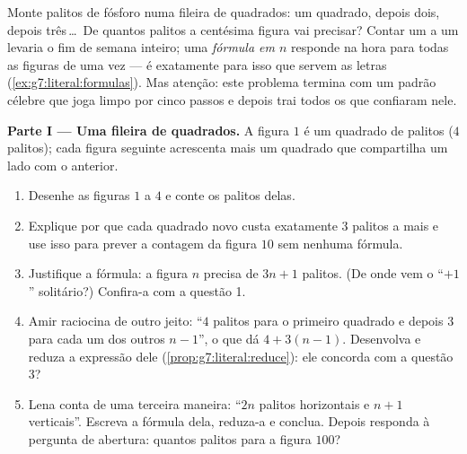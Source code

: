 \begin{problem}
\label{pb:g7:literal:1}
Monte palitos de fósforo numa fileira de quadrados: um quadrado, depois
dois, depois três\,\dots\ De quantos palitos a centésima figura vai
precisar? Contar um a um levaria o fim de semana inteiro; uma
\emph{fórmula em $n$} responde na hora para todas as figuras de uma vez
--- é exatamente para isso que servem as letras
(\cref{ex:g7:literal:formulas}). Mas atenção: este problema termina com
um padrão célebre que joga limpo por cinco passos e depois trai todos
os que confiaram nele.

\medskip
\noindent\textbf{Parte I --- Uma fileira de quadrados.}
A figura $1$ é um quadrado de palitos ($4$ palitos); cada figura
seguinte acrescenta mais um quadrado que compartilha um lado com o
anterior.
\begin{enumerate}
  \item Desenhe as figuras $1$ a $4$ e conte os palitos delas.
  \item Explique por que cada quadrado novo custa exatamente $3$
        palitos a mais e use isso para prever a contagem da figura $10$
        sem nenhuma fórmula.
  \item Justifique a fórmula: a figura $n$ precisa de $3n + 1$ palitos.
        (De onde vem o ``$+1$'' solitário?) Confira-a com a questão 1.
  \item Amir raciocina de outro jeito: ``$4$ palitos para o primeiro
        quadrado e depois $3$ para cada um dos outros $n - 1$'', o que
        dá $4 + 3(n - 1)$. Desenvolva e reduza a expressão dele
        (\cref{prop:g7:literal:reduce}): ele concorda com a questão 3?
  \item Lena conta de uma terceira maneira: ``$2n$ palitos horizontais
        e $n + 1$ verticais''. Escreva a fórmula dela, reduza-a e
        conclua. Depois responda à pergunta de abertura: quantos
        palitos para a figura $100$?
\end{enumerate}


\end{problem}
